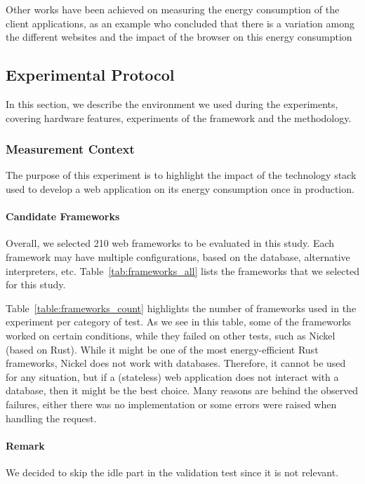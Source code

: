 Other works have been achieved on measuring the energy consumption of the client applications, as an example \cite{philippot_characterization_2014} who concluded that there is a variation among the different websites and the impact of the browser on this energy consumption

\newcommand\duration{20}
\newcommand\parallelclient{512}
\subsection{Experimental Protocol}
In this section, we describe the environment we used during the experiments, covering hardware features, experiments of the framework and the methodology.

\subsubsection{Measurement Context}
The purpose of this experiment is to highlight the impact of the technology stack used to develop a web application on its energy consumption once in production.
\paragraph{Candidate Frameworks}
Overall, we selected 210 web frameworks to be evaluated in this study.
Each framework may have multiple configurations, based on the database, alternative interpreters, etc.
Table~\ref{tab:frameworks_all} lists the frameworks that we selected for this study.

% 
Table~\ref{table:frameworks_count} highlights the number of frameworks used in the experiment per category of test.
As we see in this table, some of the frameworks worked on certain conditions, while they failed on other tests, such as Nickel (based on Rust).
While it might be one of the most energy-efficient Rust frameworks, Nickel does not work with databases.
Therefore, it cannot be used for any situation, but if a (stateless) web application does not interact with a database, then it might be the best choice.
Many reasons are behind the observed failures, either there was no implementation or some errors were raised when handling the request.

\paragraph{Remark}
We decided to skip the idle part in the validation test since it is not relevant.

